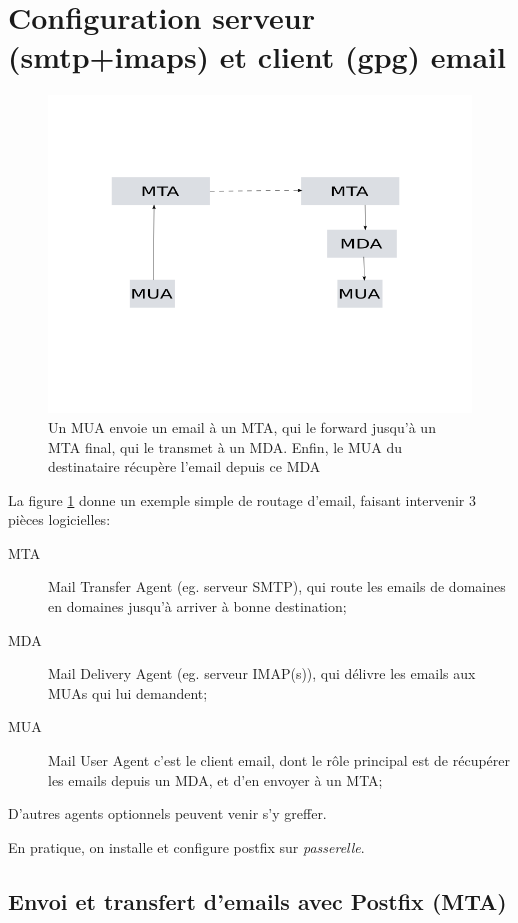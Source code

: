 \documentclass[a4paper]{article}
\begin{document}
\section{Configuration serveur (smtp+imaps) et client (gpg) email}
\begin{figure}[!ht]
	\centering
	\includegraphics[scale=.5]{emailrouting.png}
	\caption{\label{emailrouting} Un MUA envoie un email à un MTA, qui
		le forward jusqu'à un MTA final, qui le transmet à un MDA.
		Enfin, le MUA du destinataire récupère l'email depuis ce MDA}
\end{figure}

La figure \ref{emailrouting} donne un exemple simple de routage d'email,
faisant intervenir $3$ pièces logicielles:
\begin{description}
	\item[MTA] Mail Transfer Agent (eg. serveur SMTP), qui route les
		emails de domaines en domaines jusqu'à arriver à bonne destination;
	\item[MDA] Mail Delivery Agent (eg. serveur IMAP(s)), qui délivre
		les emails aux MUAs qui lui demandent;
	\item[MUA] Mail User Agent c'est le client email, dont le rôle principal
		est de récupérer les emails depuis un MDA, et d'en envoyer à un MTA;
\end{description}
D'autres agents optionnels peuvent venir s'y greffer.

En pratique, on installe et configure postfix sur \textit{passerelle}.

\subsection{Envoi et transfert d'emails avec Postfix (MTA)}
\end{document}
